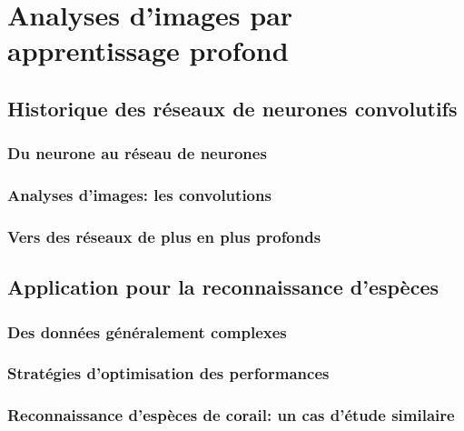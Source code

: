 \newpage

\section[Analyse d'image]{Analyses d'images par apprentissage profond}
\subsection{Historique des réseaux de neurones convolutifs}
\subsubsection{Du neurone au réseau de neurones}
\subsubsection{Analyses d'images: les convolutions}
\subsubsection{Vers des réseaux de plus en plus profonds}

\newpage

\subsection[Reconnaissance d'espèces]{Application pour la reconnaissance d'espèces}
\subsubsection{Des données généralement complexes}

\small



\normalsize

\subsubsection{Stratégies d'optimisation des performances}
\subsubsection{Reconnaissance d'espèces de corail: un cas d'étude similaire}


